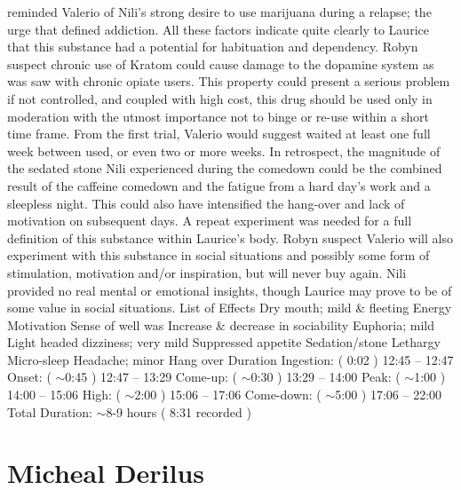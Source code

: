 \documentclass[12pt]{book}
\begin{document}
reminded Valerio of Nili's strong desire to use marijuana during a relapse; the urge that defined addiction. All these factors indicate quite clearly to Laurice that this substance had a potential for habituation and dependency. Robyn suspect chronic use of Kratom could cause damage to the dopamine system as was saw with chronic opiate users. This property could present a serious problem if not controlled, and coupled with high cost, this drug should be used only in moderation with the utmost importance not to binge or re-use within a short time frame. From the first trial, Valerio would suggest waited at least one full week between used, or even two or more weeks. In retrospect, the magnitude of the sedated stone Nili experienced during the comedown could be the combined result of the caffeine comedown and the fatigue from a hard day's work and a sleepless night. This could also have intensified the hang-over and lack of motivation on subsequent days. A repeat experiment was needed for a full definition of this substance within Laurice's body. Robyn suspect Valerio will also experiment with this substance in social situations and possibly some form of stimulation, motivation and/or inspiration, but will never buy again. Nili provided no real mental or emotional insights, though Laurice may prove to be of some value in social situations. List of Effects Dry mouth; mild \& fleeting Energy Motivation Sense of well was Increase \& decrease in sociability Euphoria; mild Light headed dizziness; very mild Suppressed appetite Sedation/stone Lethargy Micro-sleep Headache; minor Hang over Duration Ingestion: ( 0:02 ) 12:45 -- 12:47 Onset: ( $\sim$0:45 ) 12:47 -- 13:29 Come-up: ( $\sim$0:30 ) 13:29 -- 14:00 Peak: ( $\sim$1:00 ) 14:00 -- 15:06 High: ( $\sim$2:00 ) 15:06 -- 17:06 Come-down: ( $\sim$5:00 ) 17:06 -- 22:00 Total Duration: $\sim$8-9 hours ( 8:31 recorded )



\chapter{Micheal Derilus}
\end{document}
